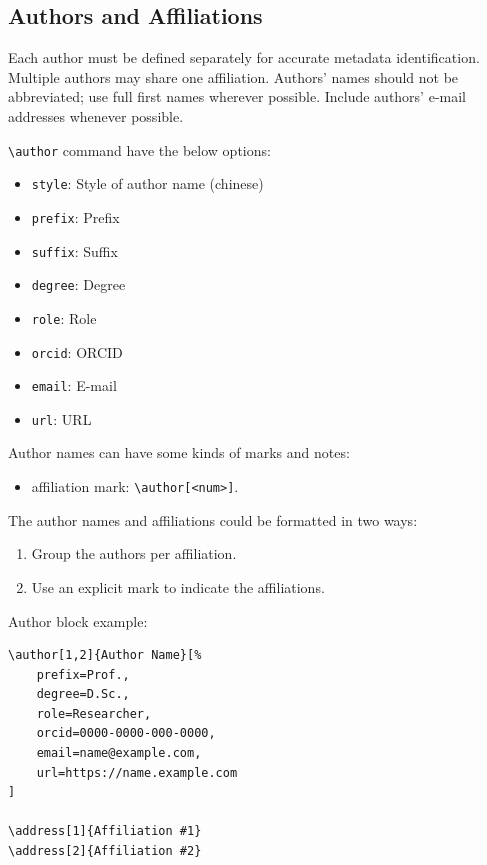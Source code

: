 \documentclass[
]{ceurart}
\begin{document}
\subsection{Authors and Affiliations}

Each author must be defined separately for accurate metadata
identification. Multiple authors may share one affiliation. Authors'
names should not be abbreviated; use full first names wherever
possible. Include authors' e-mail addresses whenever possible.

\verb|\author| command have the below options:

\begin{itemize}
\item \verb|style|: Style of author name (chinese)
\item \verb|prefix|: Prefix
\item \verb|suffix|: Suffix
\item \verb|degree|: Degree
\item \verb|role|: Role
\item \verb|orcid|: ORCID
\item \verb|email|: E-mail
\item \verb|url|: URL
\end{itemize}

Author names can have some kinds of marks and notes:
\begin{itemize}
\item affiliation mark: \verb|\author[<num>]|.
\end{itemize}

The author names and affiliations could be formatted in two ways:
\begin{enumerate}
\item Group the authors per affiliation.
\item Use an explicit mark to indicate the affiliations.
\end{enumerate}

Author block example:
\begin{verbatim}
\author[1,2]{Author Name}[%
    prefix=Prof.,
    degree=D.Sc.,
    role=Researcher,
    orcid=0000-0000-000-0000,
    email=name@example.com,
    url=https://name.example.com
]

\address[1]{Affiliation #1}
\address[2]{Affiliation #2}
\end{verbatim}
\end{document}
